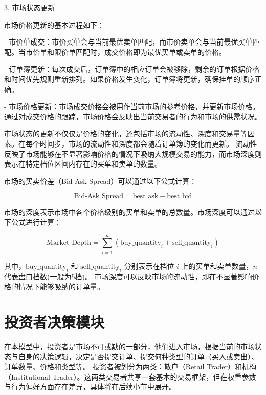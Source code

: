 3. 市场状态更新

市场价格更新的基本过程如下：

- 市价单成交：市价买单会与当前最优卖单匹配，而市价卖单会与当前最优买单匹配。当市价单和限价单匹配时，成交价格即为最优买单或卖单的价格。
   
- 订单簿更新：每次成交后，订单簿中的相应订单会被移除，剩余的订单根据价格和时间优先规则重新排列。如果价格发生变化，订单簿将更新，确保挂单的顺序正确。

- 市场价格更新：市场成交价格会被用作当前市场的参考价格，并更新市场价格。通过对成交价格的跟踪，市场价格会反映出当前交易者的行为和市场的供需状况。

市场状态的更新不仅仅是价格的变化，还包括市场的流动性、深度和交易量等因素。在每个时间步，市场的流动性和深度都会随着订单簿的变化而更新。
流动性反映了市场能够在不显著影响价格的情况下吸纳大规模交易的能力，而市场深度则表示在特定档位区间内存在的买单和卖单的数量。

市场的买卖价差（Bid-Ask Spread）可以通过以下公式计算：

\begin{equation}
    \text{Bid-Ask Spread} = \text{best\_ask} - \text{best\_bid}
\end{equation}

市场的深度表示市场中各个价格级别的买单和卖单的总数量。市场深度可以通过以下公式进行计算：

\begin{equation}
    \text{Market Depth} = \sum_{i=1}^{n} (\text{buy\_quantity}_i + \text{sell\_quantity}_i)
\end{equation}

其中，\( \text{buy\_quantity}_i \) 和 \( \text{sell\_quantity}_i \) 分别表示在档位 \( i \) 上的买单和卖单数量，\( n \)代表盘口档数(一般为5档)。
市场深度可以反映市场的流动性，即在不显著影响价格的情况下能够吸纳的订单量。





\section{投资者决策模块}


在本模型中，投资者是市场不可或缺的一部分，他们进入市场，根据当前的市场状态与自身的决策逻辑，决定是否提交订单、提交何种类型的订单（买入或卖出）、订单数量、价格和类型等。
投资者被划分为两类：散户（Retail Trader）和机构（Institutional Trader）。这两类交易者共享一套基本的交易框架，但在权重参数与行为偏好方面存在差异，具体将在后续小节中展开。

